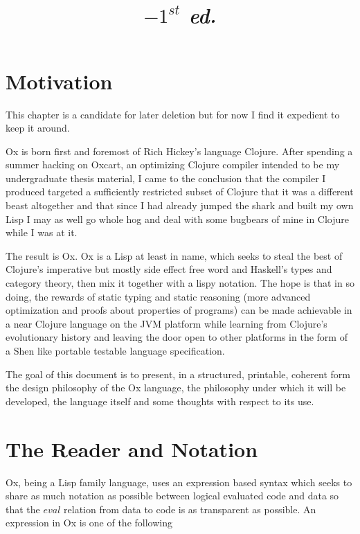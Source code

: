 \documentclass{report}
\title{
  \vspace{2in}
  \textmd{\textbf{\Title}}\\
  \vspace{0.1in}\large{\textit{$-1^{st}$ ed.}}
  \vspace{3in}
}
\author{\textbf{\AuthorName}}
\date{}
\begin{document}
\maketitle


\newpage
\tableofcontents
\newpage

\chapter{Motivation}

This chapter is a candidate for later deletion but for now I find it expedient
to keep it around.

Ox is born first and foremost of Rich Hickey's language Clojure. After spending
a summer hacking on Oxcart, an optimizing Clojure compiler intended to be my
undergraduate thesis material, I came to the conclusion that the compiler I
produced targeted a sufficiently restricted subset of Clojure that it was a
different beast altogether and that since I had already jumped the shark and
built my own Lisp I may as well go whole hog and deal with some bugbears of mine
in Clojure while I was at it.

The result is Ox. Ox is a Lisp at least in name, which seeks to steal the best
of Clojure's imperative but mostly side effect free word and Haskell's types and
category theory, then mix it together with a lispy notation. The hope is that in
so doing, the rewards of static typing and static reasoning (more advanced
optimization and proofs about properties of programs) can be made achievable in
a near Clojure language on the JVM platform while learning from Clojure's
evolutionary history and leaving the door open to other platforms in the form of
a Shen like portable testable language specification.

The goal of this document is to present, in a structured, printable, coherent
form the design philosophy of the Ox language, the philosophy under which it
will be developed, the language itself and some thoughts with respect to its
use.

\chapter{The Reader and Notation}


Ox, being a Lisp family language, uses an expression based syntax which seeks to
share as much notation as possible between logical evaluated code and data so
that the $eval$ relation from data to code is as transparent as possible. An
expression in Ox is one of the following
\end{document}
